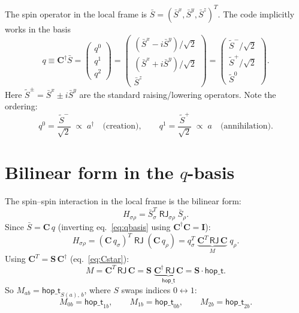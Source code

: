 \documentclass[11pt]{article}
\newcommand{\hop}{\mathsf{hop\_t}}
\newcommand{\dg}{^\dagger}
\begin{document}
The spin operator in the local frame is $\bar{S} = (\bar{S}^x, \bar{S}^y,
\bar{S}^z)^T$.  The code implicitly works in the basis
\begin{equation}\label{eq:qbasis}
  q \equiv \mathbf{C}\dg \bar{S}
  = \begin{pmatrix}
    q^0 \\ q^1 \\ q^2
  \end{pmatrix}
  = \begin{pmatrix}
    (\bar{S}^x - i\bar{S}^y)/\sqrt{2} \\[2pt]
    (\bar{S}^x + i\bar{S}^y)/\sqrt{2} \\[2pt]
    \bar{S}^z
  \end{pmatrix}
  = \begin{pmatrix}
    \tilde{S}^-/\sqrt{2} \\[2pt]
    \tilde{S}^+/\sqrt{2} \\[2pt]
    \tilde{S}^0
  \end{pmatrix}.
\end{equation}
Here $\tilde{S}^\pm = \bar{S}^x \pm i\bar{S}^y$ are the standard
raising/lowering operators.  Note the ordering:
\begin{equation}
  \boxed{
    q^0 = \frac{\tilde{S}^-}{\sqrt{2}} \;\propto\; a\dg
    \quad\text{(creation)},
    \qquad
    q^1 = \frac{\tilde{S}^+}{\sqrt{2}} \;\propto\; a
    \quad\text{(annihilation)}.
  }
\end{equation}


\section{Bilinear form in the $q$-basis}

The spin--spin interaction in the local frame is the bilinear form:
\begin{equation}
  H_{\sigma\rho} = \bar{S}_\sigma^T\; \mathsf{RJ}_{\sigma\rho}\; \bar{S}_\rho.
\end{equation}
Since $\bar{S} = \mathbf{C}\,q$ (inverting eq.~\eqref{eq:qbasis}
using $\mathbf{C}\dg\mathbf{C} = \mathbf{I}$):
\begin{equation}\label{eq:bilinear}
  H_{\sigma\rho}
  = (\mathbf{C}\,q_\sigma)^T\;\mathsf{RJ}\;(\mathbf{C}\,q_\rho)
  = q_\sigma^T\;\underbrace{\mathbf{C}^T\,\mathsf{RJ}\,\mathbf{C}}_{\displaystyle M}\;
    q_\rho.
\end{equation}
Using $\mathbf{C}^T = \mathbf{S}\,\mathbf{C}\dg$ (eq.~\eqref{eq:Cstar}):
\begin{equation}\label{eq:M}
  \boxed{
    M = \mathbf{C}^T\,\mathsf{RJ}\,\mathbf{C}
      = \mathbf{S}\;\underbrace{\mathbf{C}\dg\,\mathsf{RJ}\,\mathbf{C}}_{\hop}
      = \mathbf{S}\cdot\hop.
  }
\end{equation}
So $M_{ab} = \hop_{S(a),\,b}$, where $S$ swaps indices $0\leftrightarrow 1$:
\begin{equation}
  M_{0b} = \hop_{1b}, \qquad
  M_{1b} = \hop_{0b}, \qquad
  M_{2b} = \hop_{2b}.
\end{equation}
\end{document}
